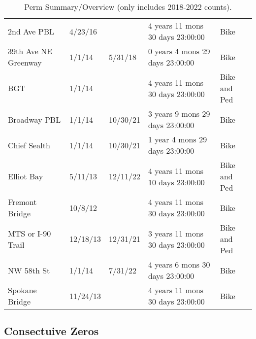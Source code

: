 \documentclass[
  letterpaper,
]{scrbook}
\begin{document}
\hypertarget{tbl-perm_summary}{}
\begin{longtable}[t]{lllll}
\caption{\label{tbl-perm_summary}Perm Summary/Overview (only includes 2018-2022 counts). }\tabularnewline

\toprule
\cellcolor[HTML]{002060}{\textcolor{white}{\textbf{name}}} & \cellcolor[HTML]{002060}{\textcolor{white}{\textbf{install\_date}}} & \cellcolor[HTML]{002060}{\textcolor{white}{\textbf{uninstall\_date}}} & \cellcolor[HTML]{002060}{\textcolor{white}{\textbf{obs\_duration}}} & \cellcolor[HTML]{002060}{\textcolor{white}{\textbf{modes}}}\\
\midrule
2nd Ave PBL & 4/23/16 &  & 4 years 11 mons 30 days 23:00:00 & Bike\\
39th Ave NE Greenway & 1/1/14 & 5/31/18 & 0 years 4 mons 29 days 23:00:00 & Bike\\
BGT & 1/1/14 &  & 4 years 11 mons 30 days 23:00:00 & Bike and Ped\\
Broadway PBL & 1/1/14 & 10/30/21 & 3 years 9 mons 29 days 23:00:00 & Bike\\
Chief Sealth & 1/1/14 & 10/30/21 & 1 year 4 mons 29 days 23:00:00 & Bike\\
\addlinespace
Elliot Bay & 5/11/13 & 12/11/22 & 4 years 11 mons 10 days 23:00:00 & Bike and Ped\\
Fremont Bridge & 10/8/12 &  & 4 years 11 mons 30 days 23:00:00 & Bike\\
MTS or I-90 Trail & 12/18/13 & 12/31/21 & 3 years 11 mons 30 days 23:00:00 & Bike and Ped\\
NW 58th St & 1/1/14 & 7/31/22 & 4 years 6 mons 30 days 23:00:00 & Bike\\
Spokane Bridge & 11/24/13 &  & 4 years 11 mons 30 days 23:00:00 & Bike\\
\bottomrule
\end{longtable}

\hypertarget{consectuive-zeros}{%
\subsection{Consectuive Zeros}\label{consectuive-zeros}}
\end{document}

